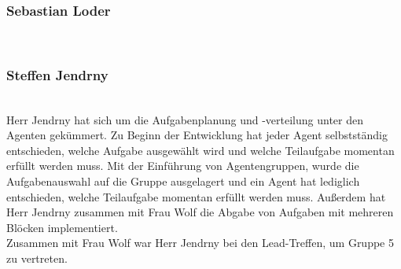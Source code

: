 \subsubsection{Sebastian Loder} ~\\
\subsubsection{Steffen Jendrny} ~\\
Herr Jendrny hat sich um die Aufgabenplanung und -verteilung unter den Agenten gekümmert. Zu Beginn der Entwicklung hat jeder Agent selbstständig entschieden, welche Aufgabe ausgewählt wird und welche Teilaufgabe momentan erfüllt werden muss. Mit der Einführung von Agentengruppen, wurde die Aufgabenauswahl auf die Gruppe ausgelagert und ein Agent hat lediglich entschieden, welche Teilaufgabe momentan erfüllt werden muss. Außerdem hat Herr Jendrny zusammen mit Frau Wolf die Abgabe von Aufgaben mit mehreren Blöcken implementiert. \\
Zusammen mit Frau Wolf war Herr Jendrny bei den Lead-Treffen, um Gruppe 5 zu vertreten.